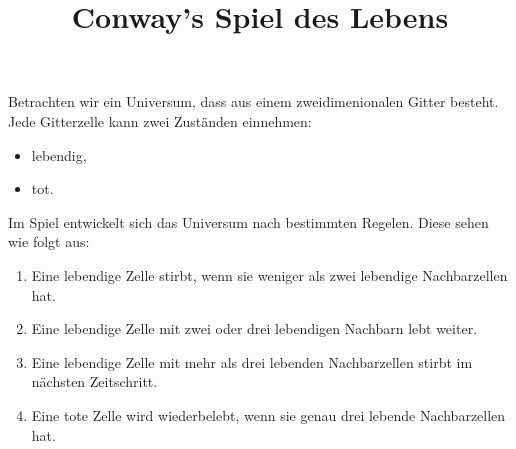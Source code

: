 \documentclass{article}[12pt]
\title{Conway's Spiel des Lebens}
\begin{document}
\maketitle


\noindent Betrachten wir ein \glqq Universum\grqq, dass aus einem zweidimenionalen Gitter besteht.
Jede Gitterzelle kann zwei Zuständen einnehmen:
\begin{itemize}
\item lebendig,
\item tot.
\end{itemize}
Im Spiel entwickelt sich das Universum nach bestimmten Regelen.
Diese sehen wie folgt aus:
\begin{enumerate}
\item Eine lebendige Zelle stirbt, wenn sie weniger als zwei lebendige Nachbarzellen hat.
\item Eine lebendige Zelle mit zwei oder drei lebendigen Nachbarn lebt weiter.
\item Eine lebendige Zelle mit mehr als drei lebenden Nachbarzellen stirbt im nächsten Zeitschritt.
\item Eine tote Zelle wird wiederbelebt, wenn sie genau drei lebende Nachbarzellen hat.
\end{enumerate}
\end{document}

